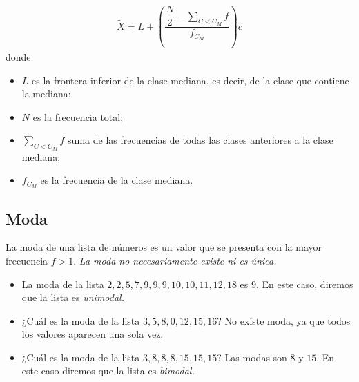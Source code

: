 



\begin{definicion}
	\begin{align}
		\tilde{X}=L+\left(
		\dfrac{ \dfrac{N}{2}-\sum_{{C<C_{M}}}f}{f_{C_{M}}}
		\right)c
	\end{align}
	donde 
	\begin{itemize}
		\item $L$ es la frontera inferior de la clase mediana, es decir, de la clase que contiene la mediana;
		\item $N$ es la frecuencia total; 
		\item $\sum_{{C<C_{M}}}f$ suma de las frecuencias de todas las clases anteriores a la clase mediana; 
		\item $f_{C_{M}}$ es la frecuencia de la clase mediana.
	\end{itemize}
	
\end{definicion}


\subsection{Moda}
La moda de una lista de números es un valor que se presenta con la mayor frecuencia $f>1$.  \emph{La moda no necesariamente existe ni es única.}


\begin{ejemplo}
	\begin{itemize}
		\item La moda de la lista $2,2,5,7,9,9,9,10,10,11,12,18$ es $9$. En este caso, diremos que la lista es \emph{unimodal.}
		\item ¿Cuál es la moda de la lista $3,5,8,0,12,15,16$? No existe moda, ya que todos los valores aparecen una sola vez.
		\item ¿Cuál es la moda de la lista $3,8,8,8,15,15,15$? Las modas son $8$ y $15$. En este caso diremos que la lista es \emph{bimodal.}
	\end{itemize}
	
\end{ejemplo}



